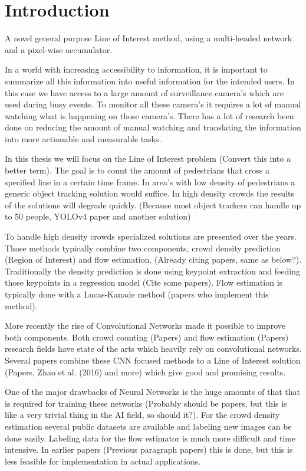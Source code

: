 \chapter{Introduction}

A novel general purpose Line of Interest method, using a multi-headed network and a pixel-wise accumulator.

In a world with increasing accessibility to information, it is important to summarize all this information into useful information for the intended users. In this case we have access to a large amount of surveillance camera's which are used during busy events. To monitor all these camera's it requires a lot of manual watching what is happening on those camera's. There has a lot of research been done on reducing the amount of manual watching and translating the information into more actionable and measurable tasks.

In this thesis we will focus on the Line of Interest problem (Convert this into a better term). The goal is to count the amount of pedestrians that cross a specified line in a certain time frame. In area's with low density of pedestrians a generic object tracking solution would suffice. In high density crowds the results of the solutions will degrade quickly. (Because most object trackers can handle up to 50 people, YOLOv4 paper and another solution)

To handle high density crowds specialized solutions are presented over the years. Those methods typically combine two components, crowd density prediction (Region of Interest) and flow estimation. (Already citing papers, same as below?). Traditionally the density prediction is done using keypoint extraction and feeding those keypoints in a regression model (Cite some papers). Flow estimation is typically done with a Lucas-Kanade method (papers who implement this method).

More recently the rise of Convolutional Networks made it possible to improve both components. Both crowd counting (Papers) and flow estimation (Papers) research fields have state of the arts which heavily rely on convolutional networks. Several papers combine these CNN focused methods to a Line of Interest solution (Papers, Zhao et al. (2016) and more) which give good and promising results.

One of the major drawbacks of Neural Networks is the huge amounts of that that is required for training these networks (Probably should be papers, but this is like a very trivial thing in the AI field, so should it?). For the crowd density estimation several public datasets are available and labeling new images can be done easily. Labeling data for the flow estimator is much more difficult and time intensive.  In earlier papers (Previous paragraph papers) this is done, but this is less feasible for implementation in actual applications.

